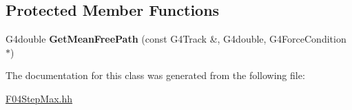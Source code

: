 \subsection*{Protected Member Functions}
\begin{DoxyCompactItemize}
\item 
\hypertarget{classF04StepMax_ad2c054bbe47952e5d7af91e5a6f5cefe}{G4double {\bfseries Get\-Mean\-Free\-Path} (const G4\-Track \&, G4double, G4\-Force\-Condition $\ast$)}\label{classF04StepMax_ad2c054bbe47952e5d7af91e5a6f5cefe}

\end{DoxyCompactItemize}


The documentation for this class was generated from the following file\-:\begin{DoxyCompactItemize}
\item 
\hyperlink{F04StepMax_8hh}{F04\-Step\-Max.\-hh}\end{DoxyCompactItemize}
